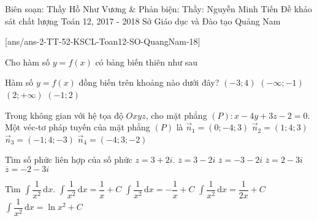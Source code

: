 
\begin{name}
{Biên soạn: Thầy Hồ Như Vương \& Phản biện: Thầy: Nguyễn Minh Tiến}
{Đề khảo sát chất lượng Toán 12, 2017 - 2018 Sở Giáo dục và Đào tạo Quảng Nam}
\end{name}
\setcounter{ex}{0}\setcounter{bt}{0}
[ans/ans-2-TT-52-KSCL-Toan12-SO-QuangNam-18]
\begin{ex}%
	Cho hàm số $y=f(x)$ có bảng biến thiên như sau
	\begin{center}
	\end{center}
	Hàm số $y=f(x)$ đồng biến trên khoảng nào dưới đây?	
	\choice
	{$(-3;4)$}
	{$(-\infty;-1)$}
	{$(2;+\infty)$}
	{\True $(-1;2)$}
\end{ex}
\begin{ex}%
	Trong không gian với hệ tọa độ $Oxyz$, cho mặt phẳng $(P)\colon x-4y+3z-2=0$. Một véc-tơ pháp tuyến của mặt phẳng $(P)$ là
	\choice
	{$\overrightarrow{n}_1=(0;-4;3)$}
	{$\overrightarrow{n}_2=(1;4;3)$}
	{\True $\overrightarrow{n}_3=(-1;4;-3)$}
	{$\overrightarrow{n}_4=(-4;3;-2)$}
\end{ex}
\begin{ex}%
	Tìm số phức liên hợp của số phức $z=3+2i$.
	\choice
	{\True $\overline{z}=3-2i$}
	{$\overline{z}=-3-2i$}
	{$\overline{z}=2-3i$}
	{$\overline{z}=-2-3i$}
\end{ex}
\begin{ex}%
	Tìm $\displaystyle \int \limits \dfrac{1}{x^2}\mathrm{\,d}x$.	
	\choice
	{$\displaystyle \int \limits \dfrac{1}{x^2} \mathrm{\,d}x=\dfrac{1}{x}+C$}
	{\True $\displaystyle \int \limits \dfrac{1}{x^2} \mathrm{\,d}x=-\dfrac{1}{x}+C$}
	{$\displaystyle \int \limits \dfrac{1}{x^2} \mathrm{\,d}x=\dfrac{1}{2x}+C$}
	{$\displaystyle \int \limits \dfrac{1}{x^2} \mathrm{\,d}x=\ln x^2+C$}
\end{ex}
